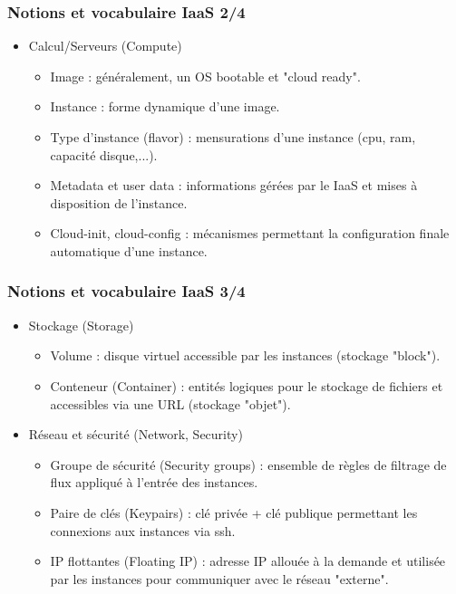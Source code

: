   \begin{frame}
    \frametitle{Notions et vocabulaire IaaS 2/4}
    \begin{itemize}
      \item Calcul/Serveurs (Compute) \pause
      \begin{itemize}
        \item Image : généralement, un OS bootable et "cloud ready". \pause
        \item Instance : forme dynamique d'une image. \pause
        \item Type d'instance (flavor) : mensurations d'une instance (cpu, ram, capacité disque,...). \pause
        \item Metadata et user data : informations gérées par le IaaS et mises à disposition de l'instance. \pause
        \item Cloud-init, cloud-config : mécanismes permettant la configuration finale automatique d'une instance. \pause
      \end{itemize}
    \end{itemize}
  \end{frame}

  \begin{frame}
    \frametitle{Notions et vocabulaire IaaS 3/4}
    \begin{itemize}
      \item Stockage (Storage) \pause
      \begin{itemize}
        \item Volume : disque virtuel accessible par les instances (stockage "block"). \pause
        \item Conteneur (Container) : entités logiques pour le stockage de fichiers et accessibles via une URL (stockage "objet"). \pause
      \end{itemize}
      \item Réseau et sécurité (Network, Security) \pause
      \begin{itemize}
        \item Groupe de sécurité (Security groups) : ensemble de règles de filtrage de flux appliqué à l'entrée des instances. \pause
        \item Paire de clés (Keypairs) : clé privée + clé publique permettant les connexions aux instances via ssh. \pause
        \item IP flottantes (Floating IP) : adresse IP allouée à la demande et utilisée par les instances pour communiquer avec le réseau "externe". \pause
      \end{itemize}
    \end{itemize}
  \end{frame}

